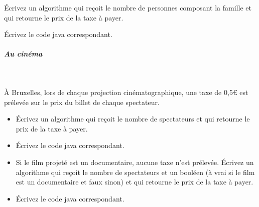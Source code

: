 \documentclass[11pt,a4paper]{article}
\begin{document}
          \'Ecrivez un algorithme qui re\c coit le nombre de personnes composant la famille et qui retourne le prix de la taxe \`a payer.
        
            \par
        \'Ecrivez le code java correspondant.
            \par
        
			
		\subparagraph{Au cin\'ema} 
		
					\textcolor{white}{.} \par
				
          \`A Bruxelles, lors de chaque projection cin\'ematographique, une taxe de 0,5€ est
          pr\'elev\'ee sur le prix du billet de chaque spectateur.
          
					\begin{itemize}
				
			\item \'Ecrivez un algorithme qui re\c coit le nombre de spectateurs et qui retourne le prix de la taxe \`a payer.
			\item \'Ecrivez le code java correspondant.
			\item 
              Si le film projet\'e est un documentaire, aucune taxe n'est pr\'elev\'ee. 
              \'Ecrivez un algorithme qui re\c coit le nombre de spectateurs et un bool\'een (\`a vrai
              si le film est un documentaire et faux sinon) et qui retourne le prix de la taxe
              \`a payer.
            
			\item \'Ecrivez le code java correspondant.
					\end{itemize}
				
            \par
        
				
\end{document}

